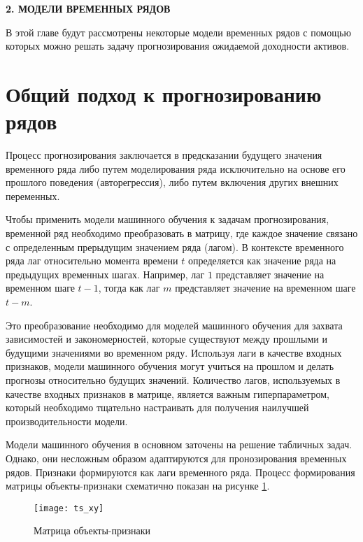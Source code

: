 \newpage
\begin{center}
	\textbf{\large 2. МОДЕЛИ ВРЕМЕННЫХ РЯДОВ}
\end{center}

В этой главе будут рассмотрены некоторые модели временных рядов
с помощью которых можно решать задачу прогнозирования ожидаемой доходности активов.

\section{Общий подход к прогнозированию рядов}

Процесс прогнозирования заключается в предсказании будущего значения временного ряда либо путем 
моделирования ряда исключительно на основе его прошлого поведения (авторегрессия), либо путем включения других внешних переменных.

Чтобы применить модели машинного обучения к задачам прогнозирования, временной ряд необходимо преобразовать в матрицу, 
где каждое значение связано с определенным прерыдущим значением ряда (лагом). 
В контексте временного ряда лаг относительно момента времени $t$ определяется как значение ряда на предыдущих временных шагах. 
Например, лаг $1$ представляет значение на временном шаге $t-1$, тогда как лаг $m$ представляет значение на временном шаге $t-m$. 

Это преобразование необходимо для моделей машинного обучения для захвата зависимостей и закономерностей, которые существуют 
между прошлыми и будущими значениями во временном ряду. Используя лаги в качестве входных признаков, модели машинного 
обучения могут учиться на прошлом и делать прогнозы относительно будущих значений. Количество лагов, используемых в качестве 
входных признаков в матрице, является важным гиперпараметром, который необходимо тщательно настраивать для получения наилучшей 
производительности модели.

Модели машинного обучения в основном заточены на решение табличных задач. Однако, они несложным образом адаптируются 
для пронозирования временных рядов.
Признаки формируются как лаги временного ряда. Процесс формирования матрицы объекты-признаки схематично
показан на рисунке \ref{fig:feature_matrix}.

\begin{figure}[H]
	\texttt{[image: ts\_xy]}
	\caption{Матрица объекты-признаки}
	\label{fig:feature_matrix}
\end{figure}

